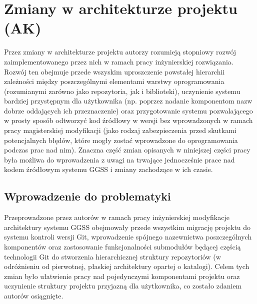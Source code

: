 \section{Zmiany w architekturze projektu (AK)}
Przez zmiany w architekturze projektu autorzy rozumieją stopniowy rozwój zaimplementowanego przez nich w ramach pracy inżynierskiej rozwiązania. Rozwój ten obejmuje przede wszyskim uproszczenie powstałej hierarchii zależności między poszczególnymi elementami warstwy oprogramowania (rozumianymi zarówno jako repozytoria, jak i biblioteki), uczynienie systemu bardziej przystępnym dla użytkownika (np. poprzez nadanie komponentom nazw dobrze oddających ich przeznaczenie) oraz przygotowanie systemu pozwalającego w prosty sposób odtworzyć kod źródłowy w wersji bez wprowadzonych w ramach pracy magisterskiej modyfikacji (jako rodzaj zabezpieczenia przed skutkami potencjalnych błędów, które mogły zostać wprowadzone do oprogramowania podczas prac nad nim). Znaczna część zmian opisanych w niniejszej części pracy była możliwa do wprowadzenia z uwagi na trwające jednocześnie prace nad kodem źródłowym systemu GGSS i zmiany zachodzące w ich czasie.

\subsection{Wprowadzenie do problematyki}
Przeprowadzone przez autorów w ramach pracy inżynierskiej modyfikacje architektury systemu GGSS obejmowały przede wszystkim migrację projektu do systemu kontroli wersji Git, wprowadzenie spójnego nazewnictwa poszczególnych komponentów oraz zastosowanie funkcjonalności submodułów będącej częścią technologii Git do stworzenia hierarchicznej struktury repozytoriów (w odróżnieniu od pierwotnej, płaskiej architektury opartej o katalogi). Celem tych zmian było ułatwienie pracy nad pojedynczymi komponentami projektu oraz uczynienie struktury projektu przyjazną dla użytkownika, co zostało zdaniem autorów osiągnięte. 

